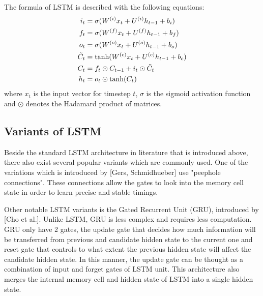 \documentclass[12pt]{extarticle}
\begin{document}
The formula of LSTM is described with the following equations:
\begin{align}
i_{t} &= \sigma(W^{(i)}x_{t} + U^{(i)}h_{t-1} + b_{i}) \\
f_{t} &= \sigma(W^{(f)}x_{t} + U^{(f)}h_{t-1} + b_{f}) \\
o_{t} &= \sigma(W^{(o)}x_{t} + U^{(o)}h_{t-1} + b_{o}) \\
\tilde{C}_{t} &= \textnormal{tanh}(W^{(c)}x_{t} + U^{(c)}h_{t-1} + b_{c}) \\
C_{t} &= f_{t} \odot C_{t-1} + i_{t} \odot \tilde{C}_{t} \\
h_{t} &= o_{t} \odot \textnormal{tanh}(C_{t})
\end{align}
where $x_{t}$ is the input vector for timestep $t$, $\sigma$ is the sigmoid activation function and $\odot$ denotes the Hadamard product of matrices. 

\subsection*{Variants of LSTM}
Beside the standard LSTM architecture in literature that is introduced above, there also exist several popular variants which are commonly used. One of the variations which is introduced by [Gers, Schmidhueber] use "peephole connections". These connections allow the gates to look into the memory cell state in order to learn precise and stable timings. 

Other notable LSTM variants is the Gated Recurrent Unit (GRU), introduced by [Cho et al.]. Unlike LSTM, GRU is less complex and requires less computation. GRU only have 2 gates, the update gate that decides how much information will be transferred from previous and candidate hidden state to the current one and reset gate that controls to what extent the previous hidden state will affect the candidate hidden state. In this manner, the update gate can be thought as a combination of input and forget gates of LSTM unit. This architecture also merges the internal memory cell and hidden state of LSTM into a single hidden state.

\end{document}
